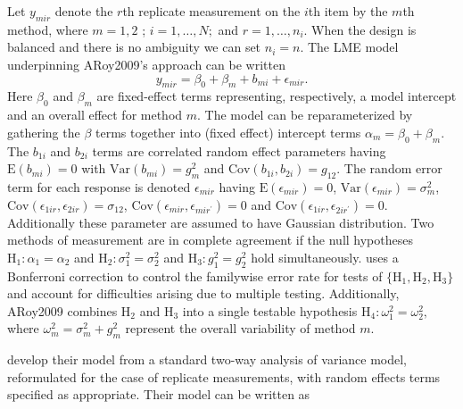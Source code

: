 \documentclass[12pt, a4paper]{report}
\theoremstyle{plain}
\theoremstyle{definition}
\theoremstyle{remark}
\begin{document}
	Let $y_{mir} $ denote the $r$th replicate measurement on the $i$th item by the $m$th method, where $m=1,2$ ; $i=1,\ldots,N;$ and $r = 1,\ldots,n_i.$ When the design is balanced and there is no ambiguity we can set $n_i=n.$ The LME model underpinning ARoy2009's approach can be written
	\begin{equation}\label{ARoy2009-model}
	y_{mir} = \beta_{0} + \beta_{m} + b_{mi} + \epsilon_{mir}.
	\end{equation}
	Here $\beta_0$ and $\beta_m$ are fixed-effect terms representing, respectively, a model intercept and an overall effect for method $m.$ The model can be reparameterized by gathering the $\beta$ terms together into (fixed effect) intercept terms $\alpha_m=\beta_0+\beta_m.$ The $b_{1i}$ and $b_{2i}$ terms are correlated random effect parameters having $\mathrm{E}(b_{mi})=0$ with $\mathrm{Var}(b_{mi})=g^2_m$ and $\mathrm{Cov}(b_{1i}, b_{2 i})=g_{12}.$ The random error term for each response is denoted $\epsilon_{mir}$ having $\mathrm{E}(\epsilon_{mir})=0$, $\mathrm{Var}(\epsilon_{mir})=\sigma^2_m$, $\mathrm{Cov}(\epsilon_{1ir}, \epsilon_{2 ir})=\sigma_{12}$, $\mathrm{Cov}(\epsilon_{mir}, \epsilon_{mir^\prime})= 0$ and $\mathrm{Cov}(\epsilon_{1ir}, \epsilon_{2 ir^\prime})= 0.$ Additionally these parameter are assumed to have Gaussian distribution. Two methods of measurement are in complete agreement if the null hypotheses $\mathrm{H}_1\colon \alpha_1 = \alpha_2$ and $\mathrm{H}_2\colon \sigma^2_1 = \sigma^2_2 $ and $\mathrm{H}_3\colon g^2_1= g^2_2$ hold simultaneously. \citet{ARoy2009} uses a Bonferroni correction to control the familywise error rate for tests of $\{\mathrm{H}_1, \mathrm{H}_2, \mathrm{H}_3\}$ and account for difficulties arising due to multiple testing. Additionally, ARoy2009 combines $\mathrm{H}_2$ and $\mathrm{H}_3$ into a single testable hypothesis $\mathrm{H}_4\colon \omega^2_1=\omega^2_2,$ where $\omega^2_m = \sigma^2_m + g^2_m$ represent the overall variability of method $m.$
	
	
	\citet{BXC2008} develop their model from a standard two-way analysis of variance model, reformulated for the case of replicate measurements, with random effects terms specified as appropriate.
	Their model can be written as
	
\end{document}
